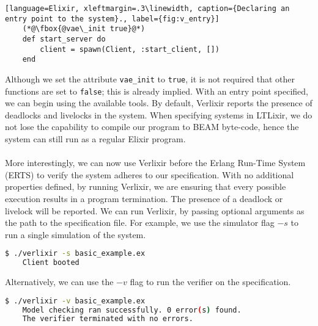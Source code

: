 \begin{lstlisting}[language=Elixir, xleftmargin=.3\linewidth, caption={Declaring an entry point to the system}., label={fig:v_entry}]
    (*@\fbox{@vae\_init true}@*)
    def start_server do
        client = spawn(Client, :start_client, [])
    end
\end{lstlisting}
Although we set the attribute \texttt{vae\_init} to \texttt{true}, it is not required that other functions are set to \texttt{false}; this is already implied. With an entry point specified, we can begin using the available tools. By default, Verlixir reports the presence of deadlocks and livelocks in the system. When specifying systems in LTLixir, we do not lose the capability to compile our program to BEAM byte-code, hence the system can still run as a regular Elixir program.
\\ \\
More interestingly, we can now use Verlixir before the Erlang Run-Time System (ERTS) to verify the system adheres to our specification. With no additional properties defined, by running Verlixir, we are ensuring that every possible execution results in a program termination. The presence of a deadlock or livelock will be reported. We can run Verlixir, by passing optional arguments as the path to the specification file. For example, we use the simulator flag $-s$ to run a single simulation of the system.
\begin{lstlisting}[language=bash, xleftmargin=.3\linewidth]
    $ ./verlixir -s basic_example.ex 
    Client booted
\end{lstlisting}
Alternatively, we can use the $-v$ flag to run the verifier on the specification.
\begin{lstlisting}[language=bash, xleftmargin=.3\linewidth]
    $ ./verlixir -v basic_example.ex 
    Model checking ran successfully. 0 error(s) found.
    The verifier terminated with no errors.
\end{lstlisting}
